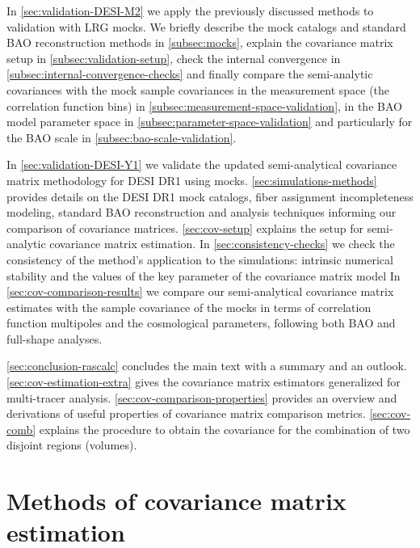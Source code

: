 In \cref{sec:validation-DESI-M2} we apply the previously discussed methods to \rascalc{} validation with \desimtwo{} LRG mocks.
We briefly describe the mock catalogs and standard BAO reconstruction methods in \cref{subsec:mocks},
explain the covariance matrix setup in \cref{subsec:validation-setup},
check the internal convergence in \cref{subsec:internal-convergence-checks}
and finally compare the semi-analytic covariances with the mock sample covariances in the measurement space (the correlation function bins) in \cref{subsec:measurement-space-validation},
in the BAO model parameter space in \cref{subsec:parameter-space-validation}
and particularly for the BAO scale in \cref{subsec:bao-scale-validation}.

In \cref{sec:validation-DESI-Y1} we validate the updated semi-analytical covariance matrix methodology for DESI DR1 using mocks.
\cref{sec:simulations-methods} provides details on the DESI DR1 mock catalogs, fiber assignment incompleteness modeling, standard BAO reconstruction and analysis techniques informing our comparison of covariance matrices.
\cref{sec:cov-setup} explains the setup for semi-analytic covariance matrix estimation.
In \cref{sec:consistency-checks} we check the consistency of the method's application to the simulations:
intrinsic numerical stability %
and
the values of the key parameter of the covariance matrix model %
In \cref{sec:cov-comparison-results} we compare our semi-analytical covariance matrix estimates with the sample covariance of the mocks in terms of correlation function multipoles %
and the cosmological parameters, %
following both BAO and full-shape analyses.

\cref{sec:conclusion-rascalc} concludes the main text with a summary and an outlook.
\cref{sec:cov-estimation-extra} gives the covariance matrix estimators generalized for multi-tracer analysis.
\cref{sec:cov-comparison-properties} provides an overview and derivations of useful properties of covariance matrix comparison metrics.
\cref{sec:cov-comb} explains the procedure to obtain the covariance for the combination of two disjoint regions (volumes).

\section{Methods of covariance matrix estimation}
\label{sec:cov-estimation}

